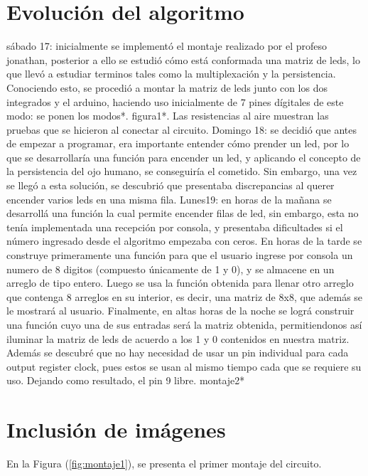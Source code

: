 \documentclass{article}
\begin{document}
\section{Evolución del algoritmo} \label{imagenes}
sábado 17: inicialmente se implementó el montaje realizado por el profeso jonathan, posterior a ello se estudió cómo está conformada una matriz de leds, lo que llevó a estudiar terminos tales como la multiplexación y la persistencia. Conociendo esto, se procedió a montar la matriz de leds junto con los dos integrados y el arduino, haciendo uso inicialmente de 7 pines dígitales de este modo: se ponen los modos*. figura1*.
Las resistencias al aire muestran las pruebas que se hicieron al conectar al circuito. \newline Domingo 18: se decidió que antes de empezar a programar, era importante entender cómo prender un led, por lo que se desarrollaría una función para encender un led, y aplicando el concepto de la persistencia del ojo humano, se conseguiría el cometido. Sin embargo, una vez se llegó a esta solución, se descubrió que presentaba discrepancias al querer encender varios leds en una misma fila. \newline
Lunes19: en horas de la mañana se desarrollá una función la cual permite encender filas de led, sin embargo, esta no tenía implementada una recepción por consola, y presentaba dificultades si el número ingresado desde el algoritmo empezaba con ceros.
 En horas de la tarde se construye primeramente una función para que el usuario ingrese por consola un numero de 8 digitos (compuesto únicamente de 1 y 0), y se almacene en un arreglo de tipo entero. Luego se usa la función obtenida para  llenar otro arreglo que contenga 8 arreglos en su interior, es decir, una matriz de 8x8, que además se le mostrará al usuario.
 Finalmente, en altas horas de la noche se lográ construir una función cuyo una de sus entradas será la matriz obtenida, permitiendonos así iluminar la matriz de leds de acuerdo a los 1 y 0 contenidos en nuestra matriz.
 Además se descubré que no hay necesidad de usar un pin individual para cada output register clock, pues estos se usan al mismo tiempo cada que se requiere su uso. Dejando como resultado, el pin 9 libre. montaje2*

\section{Inclusión de imágenes} \label{imagenes}

En la Figura (\ref{fig:montaje1}), se presenta el primer montaje del circuito. 
\end{document}
